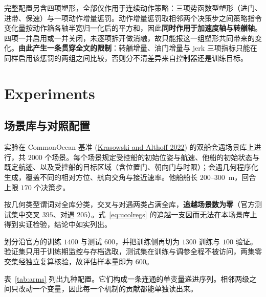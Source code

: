 \documentclass[12pt,letterpaper]{article}
\newcommand{\citl}[2]{(\hyperlink{ref:#1}{#2})}
\begin{document}
完整配置另含四项塑形，全部仅作用于连续动作策略：三项势函数型塑形（进门、进带、保速）与一项动作增量惩罚。动作增量惩罚取相邻两个决策步之间策略指令变化量按动作箱各轴半宽归一化后的平方和，因此\textbf{同时作用于加速度轴与转艏轴}。四项一并启用或一并关闭，未逐项拆开做消融，故只能报这一组塑形共同带来的变化。\textbf{由此产生一条贯穿全文的限制}：转艏增量、油门增量与 jerk 三项指标只能在同样启用该惩罚的两组之间比较，否则分不清差异来自控制器还是训练目标。



\section{Experiments}
\label{sec:exp}

\subsection{场景库与对照配置}
\label{sec:setup}

实验在 CommonOcean 基准 \citl{krasowski2022}{Krasowski and Althoff 2022} 的双船会遇场景库上进行，共 $2000$ 个场景。每个场景规定受控船的初始位姿与航速、他船的初始状态与既定航迹、以及受控船的目标区域（含位置门、朝向门与时限）；会遇几何程序化生成，覆盖不同的相对方位、航向交角与接近速率。他船船长 $200$--$300$~m，回合上限 $170$ 个决策步。

按几何类型谓词对全库分类，交叉与对遇两类占满全库，\textbf{追越场景数为零}（官方测试集中交叉 $395$、对遇 $205$）。式~\eqref{eq:ucolregs} 的追越一支因而无法在本场景库上得到实证检验，结论中如实列出。

划分沿官方的训练 $1400$ 与测试 $600$，并把训练侧再切为 $1300$ 训练与 $100$ 验证。验证集只用于训练期监控与存档选取，测试集在训练与调参全程不被访问，两集零交集经独立复算核验，故评估样本量即为 $600$。


\label{sec:arms}

表~\ref{tab:arms} 列出九种配置。它们构成一条连通的单变量递进序列。相邻两级之间只改动一个变量，因此每一个机制的贡献都能单独读出来。
\end{document}
